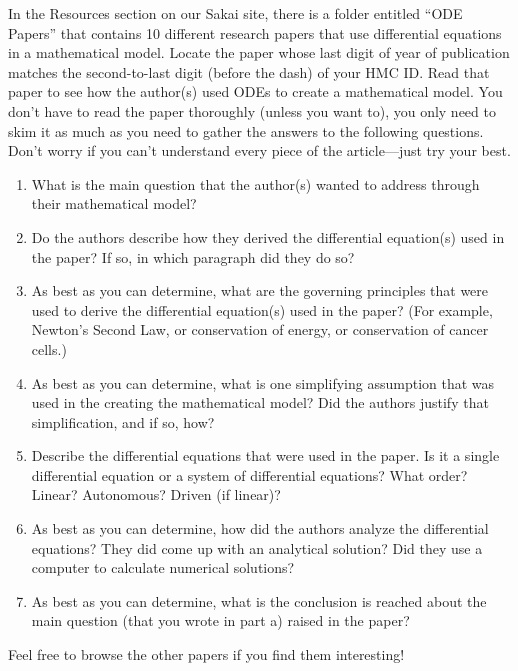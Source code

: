 \documentclass[12pt,letterpaper]{hmcpset}
\begin{document}
\begin{solution}
    \vfill
\end{solution}
\newpage

\begin{problem}[5]
    In the Resources section on our Sakai site, there is a folder entitled ``ODE Papers'' that contains 10 different research papers that use differential equations in a mathematical model.  Locate the paper whose last digit of year of publication matches the second-to-last digit (before the dash) of your HMC ID. Read that paper to see how the author(s) used ODEs to create a mathematical model. You don't have to read the paper thoroughly (unless you want to), you only need to skim it as much as you need to gather the answers to the following questions. Don't worry if you can't understand every piece of the article---just try your best.
    \begin{enumerate}
        \item What is the main question that the author(s) wanted to address through their mathematical model?
        \item Do the authors describe how they derived the differential equation(s) used in the paper?  If so, in which paragraph did they do so?
        \item As best as you can determine, what are the governing principles that were used to derive the differential equation(s) used in the paper?  (For example, Newton's Second Law, or conservation of energy, or conservation of cancer cells.)
        \item As best as you can determine, what is one simplifying assumption that was used in the creating the mathematical model?  Did the authors justify that simplification, and if so, how?
        \item Describe the differential equations that were used in the paper. Is it a single differential equation or a system of differential equations? What order? Linear? Autonomous? Driven (if linear)? 
        \item As best as you can determine, how did the authors analyze the differential equations?  They did come up with an analytical solution?  Did they use a computer to calculate numerical solutions?
        \item As best as you can determine, what is the conclusion is reached about the main question (that you wrote in part a) raised in the paper?
    \end{enumerate}
    Feel free to browse the other papers if you find them interesting!
\end{problem}
\newpage
\begin{solution}
    \null\vfill
\end{solution}
\end{document}

